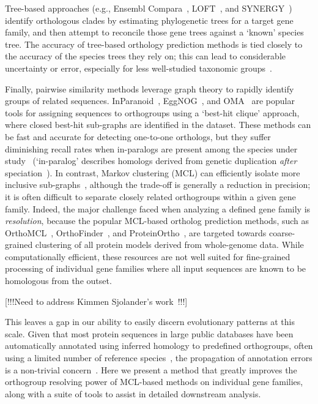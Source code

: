 \documentclass[twocolumn]{bmcart}  %
\begin{document}
Tree-based approaches (e.g., Ensembl Compara~\cite{Vilella:2009ju}, LOFT~\cite{vanderHeijden:2007bo}, and SYNERGY~\cite{Wapinski:2007fa}) identify orthologous clades by estimating phylogenetic trees for a target gene family, and then attempt to reconcile those gene trees against a `known' species tree.
The accuracy of tree-based orthology prediction methods is tied closely to the accuracy of the species trees they rely on;
this can lead to considerable uncertainty or error, especially for less well-studied taxonomic groups~\cite{Xu:2016ek}.

Finally, pairwise similarity methods leverage graph theory to rapidly identify groups of related sequences.
InParanoid~\cite{OBrien:2005cy}, EggNOG~\cite{Jensen:2007cc}, and OMA~\cite{Roth:2009iu} are popular tools for assigning sequences to orthogroups using a `best-hit clique' approach, where closed best-hit sub-graphs are identified in the dataset.
These methods can be fast and accurate for detecting one-to-one orthologs, but they suffer diminishing recall rates when in-paralogs are present among the species under study~\cite{Dalquen:2013fz} (`in-paralog' describes homologs derived from genetic duplication \textit{after} speciation~\cite{Sonnhammer:2002vm,Tekaia:2016ga}).
In contrast, Markov clustering (MCL) can efficiently isolate more inclusive sub-graphs~\cite{VanDongen:kJZ890qx,Enright:2002uq}, although the trade-off is generally a reduction in precision;
it is often difficult to separate closely related orthogroups within a given gene family.
Indeed, the major challenge faced when analyzing a defined gene family is \textit{resolution}, because the popular MCL-based ortholog prediction methods, such as OrthoMCL~\cite{Li:2003en}, OrthoFinder~\cite{Emms:2015ig}, and ProteinOrtho~\cite{Lechner:2011jk}, are targeted towards coarse-grained clustering of all protein models derived from whole-genome data.
While computationally efficient, these resources are not well suited for fine-grained processing of individual gene families where all input sequences are known to be homologous from the outset.

[!!!Need to address Kimmen Sjolander's work~\cite{Brown:2007dp,Krishnamurthy:2007fs}!!!]

This leaves a gap in our ability to easily discern evolutionary patterns at this scale.
Given that most protein sequences in large public databases have been automatically annotated using inferred homology to predefined orthogroups, often using a limited number of reference species~\cite{Aken:2016dl,Mi:2016bw,OLeary:2016cm}, the propagation of annotation errors is a non-trivial concern~\cite{Schnoes:2009gb}.
Here we present a method that greatly improves the orthogroup resolving power of MCL-based methods on individual gene families, along with a suite of tools to assist in detailed downstream analysis.
\end{document}

